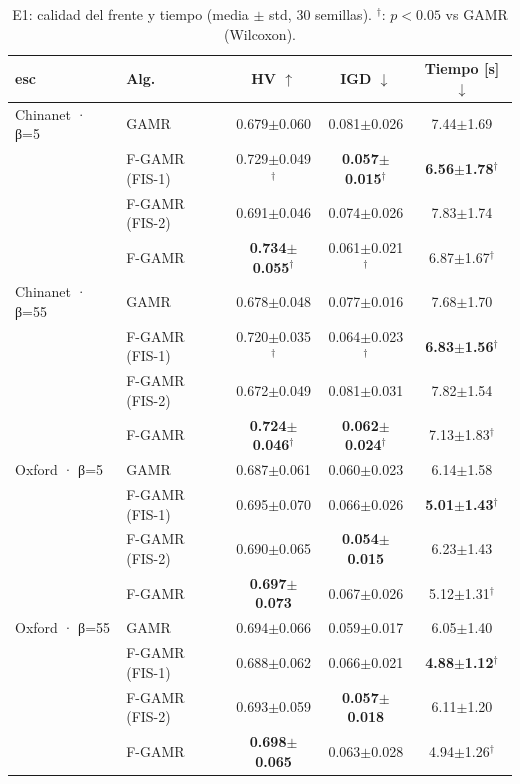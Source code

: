 \begin{table}[t]
\centering
\scriptsize
\caption{E1: calidad del frente y tiempo (media $\pm$ std, 30 semillas). $^\dagger$: $p<0.05$ vs GAMR (Wilcoxon).}
\label{tab:e1moo}
\setlength{\tabcolsep}{2.5pt}
\begin{tabular}{llccc}
\toprule
esc & Alg. & HV $\uparrow$ & IGD $\downarrow$ & Tiempo [s] $\downarrow$ \\
\midrule
Chinanet · β=5%
 & GAMR & 0.679$\pm$0.060 & 0.081$\pm$0.026 & 7.44$\pm$1.69 \\
 & F-GAMR (FIS-1) & 0.729$\pm$0.049$^\dagger$ & \textbf{0.057$\pm$0.015}$^\dagger$ & \textbf{6.56$\pm$1.78}$^\dagger$ \\
 & F-GAMR (FIS-2) & 0.691$\pm$0.046 & 0.074$\pm$0.026 & 7.83$\pm$1.74 \\
 & F-GAMR & \textbf{0.734$\pm$0.055}$^\dagger$ & 0.061$\pm$0.021$^\dagger$ & 6.87$\pm$1.67$^\dagger$ \\
\midrule
Chinanet · β=55%
 & GAMR & 0.678$\pm$0.048 & 0.077$\pm$0.016 & 7.68$\pm$1.70 \\
 & F-GAMR (FIS-1) & 0.720$\pm$0.035$^\dagger$ & 0.064$\pm$0.023$^\dagger$ & \textbf{6.83$\pm$1.56}$^\dagger$ \\
 & F-GAMR (FIS-2) & 0.672$\pm$0.049 & 0.081$\pm$0.031 & 7.82$\pm$1.54 \\
 & F-GAMR & \textbf{0.724$\pm$0.046}$^\dagger$ & \textbf{0.062$\pm$0.024}$^\dagger$ & 7.13$\pm$1.83$^\dagger$ \\
\midrule
Oxford · β=5%
 & GAMR & 0.687$\pm$0.061 & 0.060$\pm$0.023 & 6.14$\pm$1.58 \\
 & F-GAMR (FIS-1) & 0.695$\pm$0.070 & 0.066$\pm$0.026 & \textbf{5.01$\pm$1.43}$^\dagger$ \\
 & F-GAMR (FIS-2) & 0.690$\pm$0.065 & \textbf{0.054$\pm$0.015} & 6.23$\pm$1.43 \\
 & F-GAMR & \textbf{0.697$\pm$0.073} & 0.067$\pm$0.026 & 5.12$\pm$1.31$^\dagger$ \\
\midrule
Oxford · β=55%
 & GAMR & 0.694$\pm$0.066 & 0.059$\pm$0.017 & 6.05$\pm$1.40 \\
 & F-GAMR (FIS-1) & 0.688$\pm$0.062 & 0.066$\pm$0.021 & \textbf{4.88$\pm$1.12}$^\dagger$ \\
 & F-GAMR (FIS-2) & 0.693$\pm$0.059 & \textbf{0.057$\pm$0.018} & 6.11$\pm$1.20 \\
 & F-GAMR & \textbf{0.698$\pm$0.065} & 0.063$\pm$0.028 & 4.94$\pm$1.26$^\dagger$ \\
\bottomrule
\end{tabular}
\end{table}
